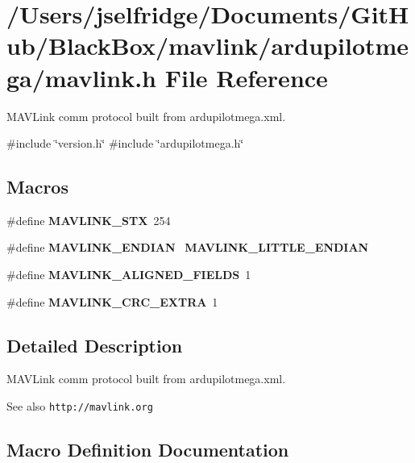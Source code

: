 \section{/\+Users/jselfridge/\+Documents/\+Git\+Hub/\+Black\+Box/mavlink/ardupilotmega/mavlink.h File Reference}
\label{ardupilotmega_2mavlink_8h}


M\+A\+V\+Link comm protocol built from ardupilotmega.\+xml.  


{\ttfamily \#include \char`\"{}version.\+h\char`\"{}}\newline
{\ttfamily \#include \char`\"{}ardupilotmega.\+h\char`\"{}}\newline
\subsection*{Macros}
\begin{DoxyCompactItemize}
\item 
\#define \textbf{ M\+A\+V\+L\+I\+N\+K\+\_\+\+S\+TX}~254
\item 
\#define \textbf{ M\+A\+V\+L\+I\+N\+K\+\_\+\+E\+N\+D\+I\+AN}~\textbf{ M\+A\+V\+L\+I\+N\+K\+\_\+\+L\+I\+T\+T\+L\+E\+\_\+\+E\+N\+D\+I\+AN}
\item 
\#define \textbf{ M\+A\+V\+L\+I\+N\+K\+\_\+\+A\+L\+I\+G\+N\+E\+D\+\_\+\+F\+I\+E\+L\+DS}~1
\item 
\#define \textbf{ M\+A\+V\+L\+I\+N\+K\+\_\+\+C\+R\+C\+\_\+\+E\+X\+T\+RA}~1
\end{DoxyCompactItemize}


\subsection{Detailed Description}
M\+A\+V\+Link comm protocol built from ardupilotmega.\+xml. 

\begin{DoxySeeAlso}{See also}
{\tt http\+://mavlink.\+org} 
\end{DoxySeeAlso}


\subsection{Macro Definition Documentation}
\mbox{\label{ardupilotmega_2mavlink_8h_a66ac6e7995651b5a5cb317194c1f46e0}} 
